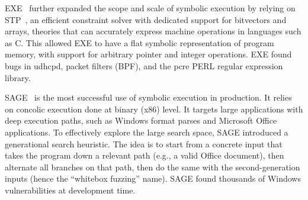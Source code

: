 EXE~\cite{exe} further expanded the scope and scale of symbolic execution by relying on STP~\cite{stp}, an efficient constraint solver with dedicated support for bitvectors and arrays, theories that can accurately express machine operations in languages such as C.
%
This allowed EXE to have a flat symbolic representation of program memory, with support for arbitrary pointer and integer operations.
%
EXE found bugs in udhcpd, packet filters (BPF), and the pcre PERL regular expression library.





SAGE~\cite{sage2012,godefroid:fuzz} is the most successful use of symbolic execution in production.  It relies on concolic execution done at binary (x86) level.  It targets large applications with deep execution paths, such as Windows format parses and Microsoft Office applications.  To effectively explore the large search space, SAGE introduced a generational search heuristic.  The idea is to start from a concrete input that takes the program down a relevant path (e.g., a valid Office document), then alternate all branches on that path, then do the same with the second-generation inputs (hence the ``whitebox fuzzing'' name).
%
SAGE found thousands of Windows vulnerabilities at development time.



